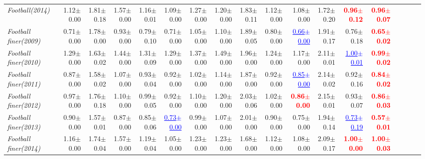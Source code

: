 \documentclass[nohyperref]{article}
\theoremstyle{plain}
\theoremstyle{definition}
\theoremstyle{remark}
\newcommand{\red}[1]{\textcolor{red}{\textbf{#1}}}
\newcommand{\blue}[1]{\textcolor{blue}{\underline{#1}}}
\begin{document}
\begin{table*}[!ht]
{\begin{tabular}{lrrrrrrrrrrrrrrrrr}
			{\it Football(2014)} & 1.12$\pm$0.00 & 1.81$\pm$0.18 & 1.57$\pm$0.00 & 1.16$\pm$0.01 & 1.09$\pm$0.00 & 1.27$\pm$0.00 & 1.20$\pm$0.00 & 1.83$\pm$0.11 & 1.12$\pm$0.00 & 1.08$\pm$0.00 & 1.72$\pm$0.20 & \red{0.96$\pm$0.12} & \red{0.96$\pm$0.07} \\
			{\it Football finer(2009)} & 0.71$\pm$0.00 & 1.78$\pm$0.00 & 0.93$\pm$0.00 & 0.79$\pm$0.10 & 0.71$\pm$0.00 & 1.05$\pm$0.00 & 1.10$\pm$0.00 & 1.89$\pm$0.05 & 0.80$\pm$0.00 & \blue{0.66$\pm$0.00} & 1.91$\pm$0.17 & 0.76$\pm$0.18 & \red{0.65$\pm$0.02} \\
			{\it Football finer(2010)} & 1.29$\pm$0.00 & 1.63$\pm$0.02 & 1.44$\pm$0.00 & 1.31$\pm$0.09 & 1.29$\pm$0.00 & 1.37$\pm$0.00 & 1.49$\pm$0.00 & 1.96$\pm$0.00 & 1.24$\pm$0.00 & 1.17$\pm$0.00 & 2.11$\pm$0.01 & \blue{1.00$\pm$0.01} & \red{0.99$\pm$0.02} \\
			{\it Football finer(2011)} & 0.87$\pm$0.00 & 1.58$\pm$0.02 & 1.07$\pm$0.00 & 0.93$\pm$0.04 & 0.92$\pm$0.00 & 1.02$\pm$0.00 & 1.14$\pm$0.00 & 1.87$\pm$0.00 & 0.92$\pm$0.00 & \blue{0.85$\pm$0.00} & 2.14$\pm$0.02 & 0.92$\pm$0.16 & \red{0.84$\pm$0.02} \\
			{\it Football finer(2012)} & 0.97$\pm$0.00 & 1.76$\pm$0.18 & 1.10$\pm$0.00 & 0.99$\pm$0.05 & 0.92$\pm$0.00 & 1.10$\pm$0.00 & 1.20$\pm$0.00 & 2.03$\pm$0.06 & 1.02$\pm$0.00 & \red{0.86$\pm$0.00} & 2.15$\pm$0.01 & 0.93$\pm$0.07 & \red{0.86$\pm$0.03} \\
			{\it Football finer(2013)} & 0.90$\pm$0.00 & 1.57$\pm$0.01 & 0.87$\pm$0.00 & 0.85$\pm$0.06 & \blue{0.73$\pm$0.00} & 0.99$\pm$0.00 & 1.07$\pm$0.00 & 2.01$\pm$0.00 & 0.90$\pm$0.00 & 0.75$\pm$0.00 & 1.94$\pm$0.14 & \blue{0.73$\pm$0.19} & \red{0.57$\pm$0.01} \\
			{\it Football finer(2014)} & 1.16$\pm$0.00 & 1.74$\pm$0.04 & 1.57$\pm$0.00 & 1.19$\pm$0.04 & 1.05$\pm$0.00 & 1.23$\pm$0.00 & 1.23$\pm$0.00 & 1.68$\pm$0.00 & 1.12$\pm$0.00 & 1.08$\pm$0.00 & 2.09$\pm$0.17 & \red{1.00$\pm$0.00} & \red{1.00$\pm$0.03} \\
\bottomrule
\end{tabular}}
\end{table*}
\end{document}
